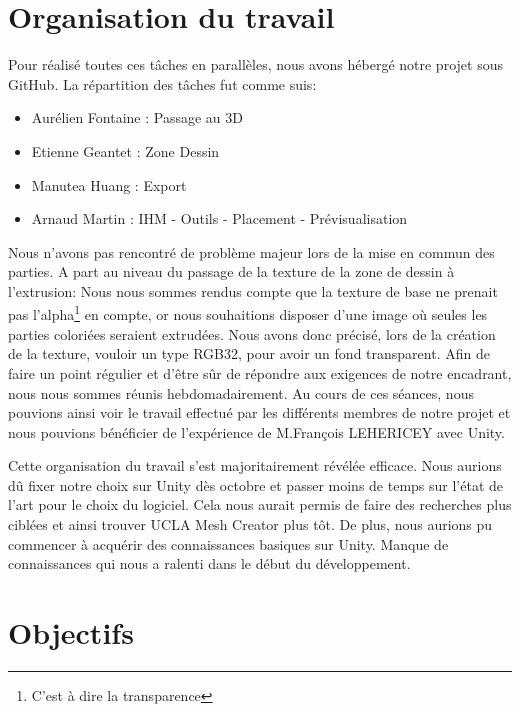 \documentclass[a4paper,11pt]{article}
\begin{document}
	\section{Organisation du travail}
				
				Pour réalisé toutes ces tâches en parallèles, nous avons hébergé notre projet sous GitHub. La répartition des tâches fut comme suis:
					\begin{itemize}

			\item	 Aurélien Fontaine : Passage au 3D
			\item	 Etienne Geantet : Zone Dessin
			\item	 Manutea Huang : Export
			\item	 Arnaud Martin : IHM - Outils - Placement - Prévisualisation
							
					\end{itemize}
				Nous n'avons pas rencontré de problème majeur lors de la mise en commun des parties. A part au niveau du passage de la texture de la zone de dessin à l'extrusion:
				 Nous nous sommes rendus compte que la texture de base ne prenait pas l'alpha\footnote{C'est à dire la transparence} en compte, or nous souhaitions disposer d'une image où seules les parties coloriées seraient extrudées. Nous avons donc précisé, lors de la création de la texture, vouloir un type RGB32, pour avoir un fond transparent.
				Afin de faire un point régulier et d'être sûr de répondre aux exigences de notre encadrant, nous nous sommes réunis hebdomadairement. Au cours de ces séances, nous pouvions ainsi voir le travail effectué par les différents membres de notre projet et nous pouvions bénéficier de l'expérience de M.François LEHERICEY avec Unity.
				
				Cette organisation du travail s'est majoritairement révélée efficace. Nous aurions dû fixer notre choix sur Unity dès octobre et passer moins de temps sur l'état de l'art pour le choix du logiciel. Cela nous aurait permis de faire des recherches plus ciblées et ainsi trouver UCLA Mesh Creator plus tôt. De plus, nous aurions pu commencer à acquérir des connaissances basiques sur Unity. Manque de connaissances qui nous a ralenti dans le début du développement.
			
	
	\section{Objectifs} 
\end{document}
